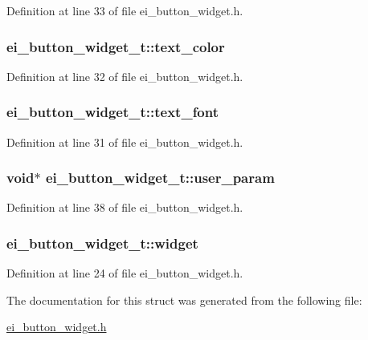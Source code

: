 Definition at line 33 of file ei\-\_\-button\-\_\-widget.\-h.

\hypertarget{structei__button__widget__t_a52b3ab3bbf1c0705ef749c34225c074f}{
\subsubsection[{text\-\_\-color}]{ ei\-\_\-button\-\_\-widget\-\_\-t\-::text\-\_\-color}}\label{structei__button__widget__t_a52b3ab3bbf1c0705ef749c34225c074f}


Definition at line 32 of file ei\-\_\-button\-\_\-widget.\-h.

\hypertarget{structei__button__widget__t_ae5e7655fbfdf95430f00a13bfd0bdad4}{
\subsubsection[{text\-\_\-font}]{ ei\-\_\-button\-\_\-widget\-\_\-t\-::text\-\_\-font}}\label{structei__button__widget__t_ae5e7655fbfdf95430f00a13bfd0bdad4}


Definition at line 31 of file ei\-\_\-button\-\_\-widget.\-h.

\hypertarget{structei__button__widget__t_a22fbd9b5b8759b559ac50b85e64c6e4f}{
\subsubsection[{user\-\_\-param}]{\setlength{\rightskip}{0pt plus 5cm}void$\ast$ ei\-\_\-button\-\_\-widget\-\_\-t\-::user\-\_\-param}}\label{structei__button__widget__t_a22fbd9b5b8759b559ac50b85e64c6e4f}


Definition at line 38 of file ei\-\_\-button\-\_\-widget.\-h.

\hypertarget{structei__button__widget__t_afe19016fcaae2769f18f3b1d73c5579d}{
\subsubsection[{widget}]{ ei\-\_\-button\-\_\-widget\-\_\-t\-::widget}}\label{structei__button__widget__t_afe19016fcaae2769f18f3b1d73c5579d}


Definition at line 24 of file ei\-\_\-button\-\_\-widget.\-h.



The documentation for this struct was generated from the following file\-:\begin{DoxyCompactItemize}
\item 
\hyperlink{ei__button__widget_8h}{ei\-\_\-button\-\_\-widget.\-h}\end{DoxyCompactItemize}
